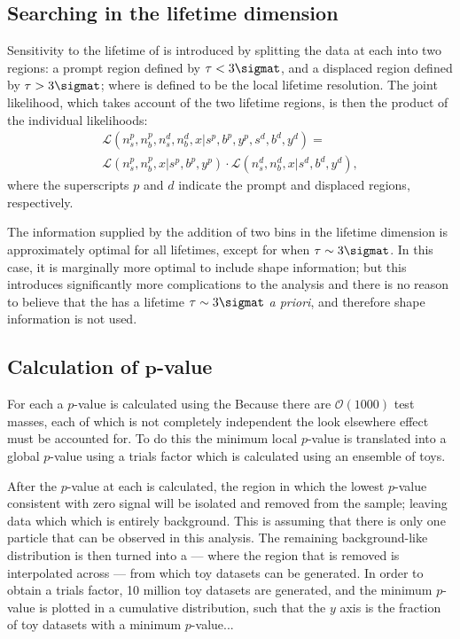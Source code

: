 \subsection{Searching in the lifetime dimension}
Sensitivity to the lifetime of \db is introduced by splitting the data at each  into two
regions: a prompt region defined by $\tau<3\sigmat$, and a displaced region defined by
$\tau>3\sigmat$; where \sigmat is defined to be the local lifetime resolution.
The joint likelihood, which takes account of the two lifetime regions, is then the product of the
individual likelihoods:
\begin{multline}
  \mathcal{L}(n^p_s, n^p_b, n^d_s, n^d_b, x | s^p, b^p, y^p, s^d, b^d, y^d) =\\
  \mathcal{L}(n^p_s, n^p_b, x | s^p, b^p, y^p) \cdot
  \mathcal{L}(n^d_s, n^d_b, x | s^d, b^d, y^d),
  \label{eq:db:liketau}
\end{multline}
where the superscripts $p$ and $d$ indicate the prompt and displaced regions, respectively.

The information supplied by the addition of two bins in the lifetime dimension is approximately
optimal for all \db lifetimes, except for when $\tau\sim3\sigmat$.
In this case, it is marginally more optimal to include shape information; but this introduces
significantly more complications to the analysis and there is no reason to believe that the \db has
a lifetime $\tau\sim3\sigmat$ \emph{a priori}, and therefore shape information is not used.




\subsection[Calculation of $p$-value]
{Calculation of $\boldsymbol{p}$-value}
For each  a $p$-value is calculated using the
Because there are $\mathcal{O}(1000)$ test masses, each of which is not completely independent the
look elsewhere effect must be accounted for.
To do this the minimum local $p$-value is translated into a global $p$-value using a trials factor
which is calculated using an ensemble of toys.

After the $p$-value at each  is calculated, the region in which the lowest $p$-value
consistent with zero signal will be isolated and removed from the sample; leaving data which
which is entirely background.
This is assuming that there is only one \np particle that can be observed in this analysis.
The remaining background-like distribution is then turned into a \PDF --- where the region that is
removed is interpolated across --- from which toy datasets can be generated.
In order to obtain a trials factor, 10 million toy datasets are generated, and the minimum
$p$-value is plotted in a cumulative distribution, such that the $y$ axis is the fraction of toy
datasets with a minimum $p$-value...











